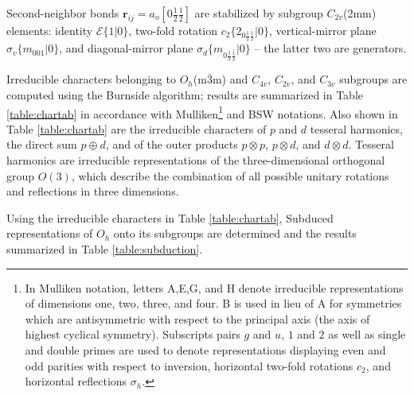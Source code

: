 \documentclass[twocolumn,showpacs,preprintnumbers,superscriptaddress,prb,floatfix,aps,10pt]{revtex4-1}
\renewcommand{\vec}[1]{\ensuremath{\mathbf{#1}}}
\newcommand*{\id}{\mathcal{E}}
\newcommand*{\bondvec}{\vec{r}_{ij}}
\newcommand{\seitz}[2]{\{#1|#2\}}
\begin{document}
Second-neighbor bonds $\bondvec = a_o[0\frac{1}{2}\frac{1}{2}]$ are stabilized by subgroup $C_{2v}$(2mm) elements: identity $\id \seitz{1}{0}$, two-fold rotation $c_2 \seitz{ 2_{0\frac{1}{2}\frac{1}{2}} }{0}$, vertical-mirror plane $\sigma_v \seitz{m_{001}}{0}$, and diagonal-mirror plane $\sigma_d \seitz{m_{0\frac{1}{2}\bar{\frac{1}{2}}}}{0}$ -- the latter two are generators.


Irreducible characters belonging to $O_h$(m$\bar{3}$m) and $C_{4v}$, $C_{2v}$, and $C_{3v}$ subgroups are computed using the Burnside algorithm; results are summarized in Table \ref{table:chartab} in accordance with Mulliken\footnote{In Mulliken notation, letters A,E,G, and H denote irreducible representations of dimensions one, two, three, and four. B is used in lieu of A for symmetries which are antisymmetric with respect to the principal axis (the axis of highest cyclical symmetry). Subscripts pairs $g$ and $u$, $1$ and $2$ as well as single and double primes are used to denote representations displaying even and odd parities with respect to inversion, horizontal two-fold rotations $c_2$, and horizontal reflections $\sigma_h$.} and BSW notations. Also shown in Table \ref{table:chartab} are the irreducible characters of $p$ and $d$ tesseral harmonics, the direct sum $p \oplus d$, and of the outer products $p \otimes p$, $p \otimes d$, and $d \otimes d$. Tesseral harmonics are irreducible representations of the three-dimensional orthogonal group $O(3)$, which describe the combination of all possible unitary rotations and reflections in three dimensions. 

Using the irreducible characters in Table \ref{table:chartab}, Subduced representations of $O_h$ onto its subgroups are determined and the results summarized in Table \ref{table:subduction}. 
\end{document}
